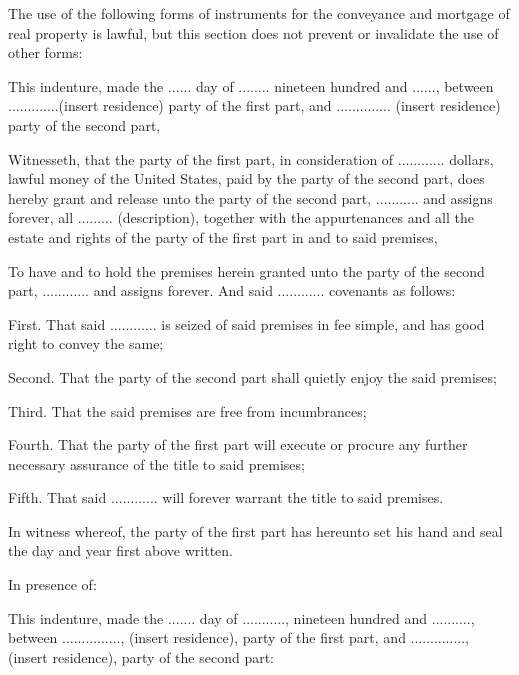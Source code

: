 

The use of the following forms of instruments for the conveyance and mortgage of
real property is lawful, but this section does not prevent or invalidate the
use of other forms: 



This indenture, made the ...... day of ........ nineteen hundred  and ......,
between .............(insert residence) party of the first part, and
.............. (insert residence) party of the second part, 

Witnesseth, that the party of the first part, in consideration of ............
dollars, lawful money of the United States, paid by the party of the second
part, does hereby grant and release unto the party of the second part,
........... and assigns forever, all ......... (description), together with the
appurtenances and all the estate and rights of the party of the first part in
and to said premises, 

To have and to hold the premises herein granted unto the party of the second
part, ............ and assigns forever. And said ............ covenants as
follows: 

First. That said ............ is seized of said premises in fee simple, and has
good right to convey the same; 

Second. That the party of the second part shall quietly enjoy the said premises;


Third. That the said premises are free from incumbrances; 

Fourth. That the party of the first part will execute or procure any further
necessary assurance of the title to said premises; 

Fifth. That said ............ will forever warrant the title to said premises. 

In witness whereof, the party of the first part has hereunto set his hand and
seal the day and year first above written. 

In presence of:



This indenture, made the ....... day of ..........., nineteen hundred  and
.........., between ..............., (insert residence), party of the first
part, and .............., (insert residence), party of the second part: 

